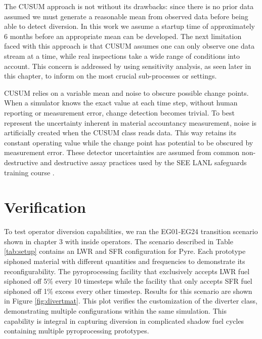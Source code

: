 The CUSUM approach is not without its drawbacks: since there is no prior data assumed we must generate a reasonable mean from observed data before being able to detect diversion. In this work
we assume a startup time of approximately 6 months before an appropriate mean can be developed. The next limitation faced with this approach is that CUSUM assumes one can only observe one data stream at a time, while
real inspections take a wide range of conditions into account. This concern is addressed by using sensitivity analysis, as seen later in this chapter, to inform on the most crucial
sub-processes or settings. 

CUSUM relies on a variable mean and noise to obscure possible change points. When a simulator knows the exact value at each time step, without human reporting or measurement error, change 
detection becomes trivial. To best represent the uncertainty inherent in material accountancy measurement, noise is artificially created when the CUSUM class reads data. This way \Cyclus retains its constant operating value while the change point
has potential to be obscured by measurement error. These detector uncertainties are assumed from common non-destructive and destructive assay practices used by the SEE LANL safeguards training course \cite{root_see_2019}.

\section{Verification}

To test operator diversion capabilities, we ran the EG01-EG24 transition scenario shown in chapter 3 with inside operators. The scenario described in Table \ref{tab:setup} contains an LWR and SFR configuration for Pyre. Each prototype siphoned material with different quantities and frequencies to demonstrate its reconfigurability. The pyroprocessing facility that exclusively accepts LWR fuel siphoned off 5\% every 10 timesteps while the facility that only accepts SFR fuel siphoned off 1\% excess every other timestep.  Results for this scenario are shown in Figure \ref{fig:divertmat}. This plot verifies the customization of the diverter class, demonstrating multiple configurations within the same simulation. This capability is integral in capturing diversion in complicated shadow fuel cycles containing multiple pyroprocessing prototypes.

